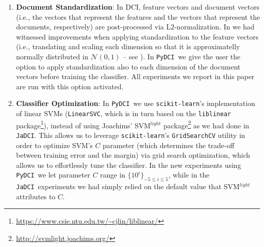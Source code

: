 \documentclass{article}
\newif\ifdraft
\newcommand{\fabscomment}[1]{\ifdraft{\leavevmode\color{cyan}[FS]: {#1}}\else{\vspace{0ex}}\fi}
\newcommand{\jadci}{\texttt{JaDCI}}
\newcommand{\pydci}{\texttt{PyDCI}}
\begin{document}
\begin{enumerate}

\item \label{item:standardization} \textbf{Document Standardization}:
  In DCI, feature vectors and document vectors (i.e., the vectors that
  represent the features and the vectors that represent the documents,
  respectively) are post-processed via L2-normalization. In
  \citep{Moreo:2016fg} we had witnessed improvements when applying
  standardization to the feature vectors (i.e., translating and
  scaling each dimension so that it is approximatelly normally
  distributed in $\mathcal{N}(0,1)$ -- see \citep[p.\
  144]{Moreo:2016fg}). In \pydci\ we give the user the option to apply
  standardization also to each dimension of the document vectors
  before training the classifier.
  All experiments we report in this paper are run with this option
  activated.

\item \label{item:optimization} \textbf{Classifier Optimization}: In
  \pydci\ we use \texttt{scikit-learn}'s implementation of linear SVMs
  (\texttt{LinearSVC}, which is in turn based on the
  \texttt{liblinear}
  package\footnote{\url{https://www.csie.ntu.edu.tw/~cjlin/liblinear/}}),
  instead of using Joachims' SVM$^{light}$
  package\footnote{\url{http://svmlight.joachims.org/}} as we had done
  in \jadci.  This allows us to leverage \texttt{scikit-learn}'s
  \texttt{GridSearchCV} utility in order to optimize SVM's $C$
  parameter (which determines the trade-off between training error and
  the margin) via grid search optimization, which allows us to
  effortlessly tune the classifier. In the new experiments using
  \pydci\ we let parameter $C$ range in $\{10^i\}_{-5\leq i\leq 5}$,
  while in the \jadci\ experiments we had simply relied on the default
  value that SVM$^{light}$ attributes to $C$.


\end{enumerate}
\end{document}
